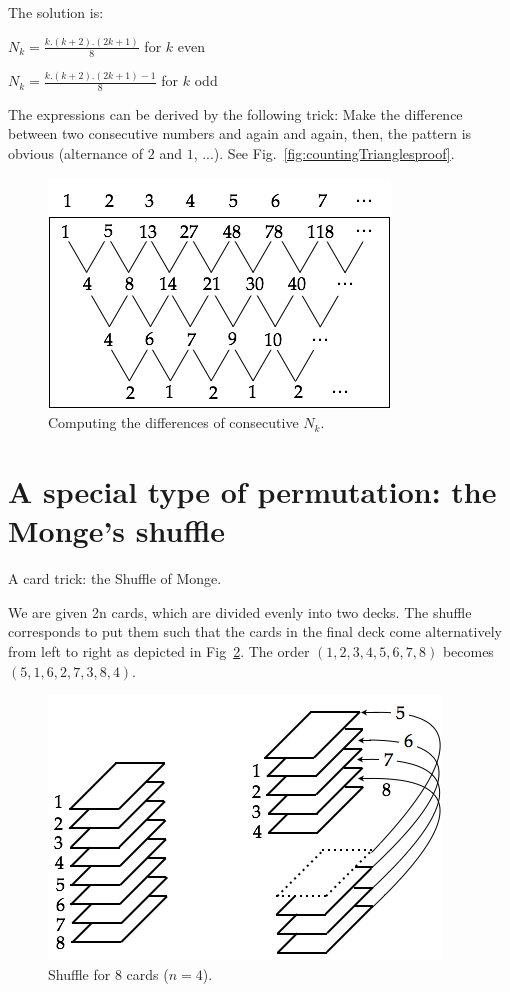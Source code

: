 \documentclass{article}[12pt]
\begin{document}
The solution is:

$N_k = \frac{k.(k+2).(2k+1)}{8}$ for $k$ even

$N_k = \frac{k.(k+2).(2k+1)-1}{8}$ for $k$ odd
\bigskip

The expressions can be derived by the following trick:
Make the difference between two consecutive numbers and again and again, then, the pattern is obvious
(alternance of $2$ and $1$, ...). See Fig.~\ref{fig:countingTrianglesproof}.
\begin{figure}[h]
\begin{center}
        \includegraphics[scale=0.5]{FiguresArithmetic/CountingTrianglesProof} 
        \caption{Computing the differences of consecutive $N_k$.}
        \label{fig:countingTrianglesProof}
\end{center}
\end{figure}


\section{A special type of permutation: the Monge's shuffle}

A card trick: the Shuffle of Monge.
\bigskip

We are given 2n cards, which are divided evenly into two decks. 
The shuffle corresponds to put them such that the cards in the final deck come alternatively from left to right as depicted 
in Fig~\ref{fig:suffleMonge}.
The order $(1,2,3,4,5,6,7,8)$ becomes $(5,1,6,2,7,3,8,4)$.
\begin{figure}[h]
\begin{center}
        \includegraphics[scale=0.5]{FiguresArithmetic/suffleMonge} 
        \caption{Shuffle for $8$ cards ($n=4$).}
        \label{fig:suffleMonge}
\end{center}
\end{figure}
\end{document}
